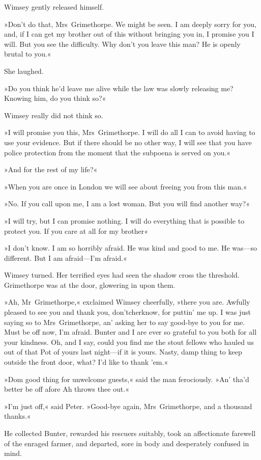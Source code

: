 Wimsey gently released himself.

»Don't do that, Mrs~Grimethorpe. We might be seen. I am deeply sorry for you, and, if I can get my brother out of this without bringing you in, I promise you I will. But you see the difficulty. Why don't you leave this man? He is openly brutal to you.«

She laughed.

»Do you think he'd leave me alive while the law was slowly releasing me? Knowing him, do you think so?«

Wimsey really did not think so.

»I will promise you this, Mrs~Grimethorpe. I will do all I can to avoid having to use your evidence. But if there should be no other way, I will see that you have police protection from the moment that the subpoena is served on you.«

»And for the rest of my life?«

»When you are once in London we will see about freeing you from this man.«

»No. If you call upon me, I am a lost woman. But you will find another way?«

»I will try, but I can promise nothing. I will do everything that is possible to protect you. If you care at all for my brother\longdash«

»I don't know. I am so horribly afraid. He was kind and good to me. He was—so different. But I am afraid—I'm afraid.«

Wimsey turned. Her terrified eyes had seen the shadow cross the threshold. Grimethorpe was at the door, glowering in upon them.

»Ah, Mr~Grimethorpe,« exclaimed Wimsey cheerfully, »there you are.  Awfully pleased to see you and thank you, don'tcherknow, for puttin' me up. I was just saying so to Mrs~Grimethorpe, an' asking her to say good-bye to you for me. Must be off now, I'm afraid. Bunter and I are ever so grateful to you both for all your kindness. Oh, and I say, could you find me the stout fellows who hauled us out of that Pot of yours last night—if it is yours. Nasty, damp thing to keep outside the front door, what? I'd like to thank 'em.«

»Dom good thing for unwelcome guests,« said the man ferociously. »An' tha'd better be off afore Ah throws thee out.«

»I'm just off,« said Peter. »Good-bye again, Mrs~Grimethorpe, and a thousand thanks.«

He collected Bunter, rewarded his rescuers suitably, took an affectionate farewell of the enraged farmer, and departed, sore in body and desperately confused in mind. 
